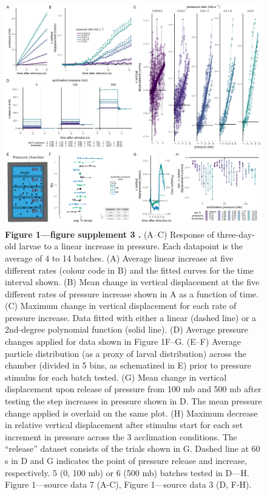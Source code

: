 \documentclass[
  11pt,
]{article}
\begin{document}
\begin{figure}[H]

{\centering \includegraphics[width=1\textwidth,height=\textheight]{Figures/Figure1-FigureSupplement3.png}

}

\caption{\textbf{Figure 1---figure supplement 3 .} (A--C) Response of
three-day-old larvae to a linear increase in pressure. Each datapoint is
the average of 4 to 14 batches. (A) Average linear increase at five
different rates (colour code in B) and the fitted curves for the time
interval shown. (B) Mean change in vertical displacement at the five
different rates of pressure increase shown in A as a function of time.
(C) Maximum change in vertical displacement for each rate of pressure
increase. Data fitted with either a linear (dashed line) or a 2nd-degree
polynomial function (solid line). (D) Average pressure changes applied
for data shown in Figure 1F--G. (E--F) Average particle distribution (as
a proxy of larval distribution) across the chamber (divided in 5 bins,
as schematized in E) prior to pressure stimulus for each batch tested.
(G) Mean change in vertical displacement upon release of pressure from
100 mb and 500 mb after testing the step increases in pressure shown in
D. The mean pressure change applied is overlaid on the same plot. (H)
Maximum decrease in relative vertical displacement after stimulus start
for each set increment in pressure across the 3 acclimation conditions.
The ``release'' dataset consists of the trials shown in G. Dashed line
at 60 s in D and G indicates the point of pressure release and increase,
respectively. 5 (0, 100 mb) or 6 (500 mb) batches tested in D---H.
Figure 1---source data 7 (A-C), Figure 1---source data 3 (D, F-H).}

\end{figure}%
\end{document}

